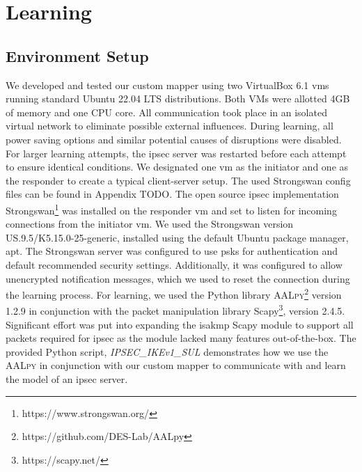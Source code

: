 %
%
% 
% 
% 

\chapter{Learning}

\label{chap:Learning}


\section{Environment Setup} \label{sec:learnenv}
We developed and tested our custom mapper using two VirtualBox 6.1 \ac{vm}s running standard Ubuntu 22.04 LTS distributions. Both VMs were allotted 4GB of memory and one CPU core. All communication took place in an isolated virtual network to eliminate possible external influences. During learning, all power saving options and similar potential causes of disruptions were disabled. For larger learning attempts, the \ac{ipsec} server was restarted before each attempt to ensure identical conditions. We designated one \ac{vm} as the initiator and one as the responder to create a typical client-server setup. The used Strongswan config files can be found in Appendix TODO. The open source \ac{ipsec} implementation Strongswan\footnote{https://www.strongswan.org/} was installed on the responder \ac{vm} and set to listen for incoming connections from the initiator \ac{vm}. We used the Strongswan version US.9.5/K5.15.0-25-generic, installed using the default Ubuntu package manager, apt. The Strongswan server was configured to use \acp{psk} for authentication and default recommended security settings. Additionally, it was configured to allow unencrypted notification messages, which we used to reset the connection during the learning process. For learning, we used the Python library \textsc{AALpy}\footnote{https://github.com/DES-Lab/AALpy} version 1.2.9 in conjunction with the packet manipulation library Scapy\footnote{https://scapy.net/}, version 2.4.5. Significant effort was put into expanding the \ac{isakmp} Scapy module to support all packets required for \ac{ipsec} as the module lacked many features out-of-the-box. The provided Python script, \emph{IPSEC\_IKEv1\_SUL} demonstrates how we use the \textsc{AALpy} in conjunction with our custom mapper to communicate with and learn the model of an \ac{ipsec} server.

